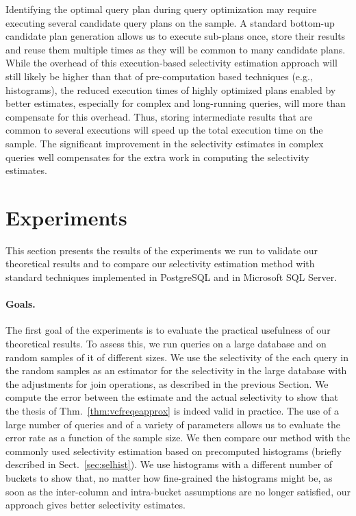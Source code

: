 Identifying the optimal query plan during query optimization may
require executing several candidate query plans on the sample. A standard
bottom-up candidate plan generation allows us to execute sub-plans once, store
their results and reuse them multiple times as they will be common to many
candidate plans. While the overhead of this execution-based selectivity
estimation approach will still likely be higher than that of pre-computation
based techniques (e.g., histograms),  the reduced execution times of highly
optimized plans enabled by better estimates, especially for complex and
long-running queries, will more than compensate for this overhead.   
Thus, storing intermediate results that are common to several executions will speed up
the total execution time on the sample. The significant improvement in the
selectivity estimates in complex queries well compensates for the extra work in
computing the selectivity estimates.

\section{Experiments}\label{sec:vcfreqexp}
This section presents the results of the experiments we run to validate our
theoretical results and to compare our selectivity estimation
method with standard techniques implemented in PostgreSQL and in
Microsoft SQL Server.

\paragraph{Goals.} The first goal of the experiments is to evaluate the practical
usefulness of our theoretical results. To assess this, we run queries on a large
database and on random samples of it of different sizes. We use the selectivity
of the each query in the random samples as an estimator for the selectivity in
the large database with the adjustments for join operations, as
described in the previous Section. We compute the error between the
estimate and the actual selectivity to show that the thesis of
Thm.~\ref{thm:vcfreqeapprox} is indeed valid in practice. The use of a large number
of queries and of a variety of parameters allows us to evaluate the error
rate as a function of the sample size. We then compare our
method with the commonly used selectivity estimation based  on precomputed
histograms (briefly described in Sect.~\ref{sec:selhist}). We use histograms
with a different number of buckets to show that, no matter how fine-grained the
histograms might be, as soon as the inter-column and intra-bucket assumptions
are no longer satisfied, our approach gives better selectivity
estimates.

